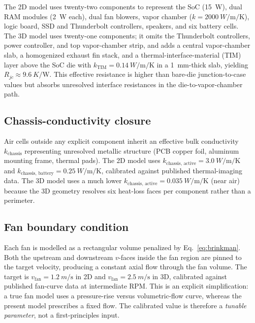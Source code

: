 \documentclass[10pt,twocolumn,letterpaper]{article}
\newcommand{\kchas}{k_{\mathrm{chassis,\,active}}}
\newcommand{\kTIM}{k_{\mathrm{TIM}}}
\newcommand{\vfan}{v_{\mathrm{fan}}}
\begin{document}
The 2D model uses twenty-two components to represent the SoC
(\SI{15}{\watt}), dual RAM modules (\SI{2}{\watt} each), dual fan
blowers, vapor chamber
($k = \SI{2000}{W\per\meter\per\kelvin}$), logic board, SSD and
Thunderbolt controllers, speakers, and six battery cells. The 3D
model uses twenty-one components; it omits the Thunderbolt
controllers, power controller, and top vapor-chamber strip, and
adds a central vapor-chamber slab, a homogenized exhaust fin
stack, and a thermal-interface-material (TIM) layer above the
SoC die with
$\kTIM = \SI{0.14}{W\per\meter\per\kelvin}$ in a \SI{1}{mm}-thick
slab, yielding $R_{jc} \approx \SI{9.6}{K\per\watt}$. This
effective resistance is higher than bare-die junction-to-case
values but absorbs unresolved interface resistances in the
die-to-vapor-chamber path.

\subsection{Chassis-conductivity closure}

Air cells outside any explicit component inherit an effective bulk
conductivity $k_{\mathrm{chassis}}$ representing unresolved
metallic structure (PCB copper foil, aluminum mounting frame,
thermal pads). The 2D model uses
$\kchas = \SI{3.0}{W\per\meter\per\kelvin}$ and
$k_{\mathrm{chassis,\,battery}} = \SI{0.25}{W\per\meter\per\kelvin}$,
calibrated against published thermal-imaging data. The 3D model
uses a much lower $\kchas = \SI{0.035}{W\per\meter\per\kelvin}$
(near air) because the 3D geometry resolves six heat-loss faces
per component rather than a perimeter.

\subsection{Fan boundary condition}
\label{sec:fanbc}

Each fan is modelled as a rectangular volume penalized by
Eq.~\eqref{eq:brinkman}. Both the upstream and downstream $v$-faces
inside the fan region are pinned to the target velocity, producing
a constant axial flow through the fan volume. The target is
$\vfan = \SI{1.2}{m\per\second}$ in 2D and
$\vfan = \SI{2.5}{m\per\second}$ in 3D, calibrated against
published fan-curve data at intermediate RPM. This is an explicit
simplification: a true fan model uses a pressure-rise versus
volumetric-flow curve, whereas the present model prescribes a
fixed flow. The calibrated value is therefore a \emph{tunable
parameter}, not a first-principles input.
\end{document}
